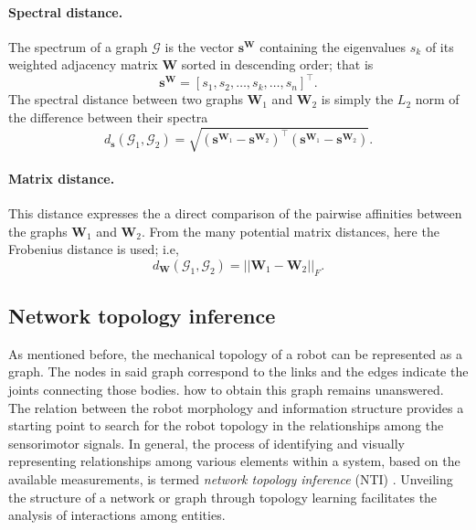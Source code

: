 \paragraph*{Spectral distance.} The spectrum of a graph $\mathcal{G}$ is the vector $ \bm{s}^{\bm{W}}$ containing the eigenvalues $s_k$ of its weighted adjacency matrix $\bm{W}$ sorted in descending order; that is
\begin{equation}
	\bm{s}^{\bm{W}} = [s_1,s_2,\ldots,s_k,\ldots,s_n]^\intercal.
\end{equation}
The spectral distance between two graphs $\bm{W}_1$ and $\bm{W}_2$ is simply the $L_2$ norm of the difference between their spectra
\begin{equation}
	d_{\bm{s}}\left(\mathcal{G}_1,\mathcal{G}_2\right) = \sqrt{\left(\bm{s}^{\bm{W}_1}-\bm{s}^{\bm{W}_2}\right)^\intercal\left(\bm{s}^{\bm{W}_1}-\bm{s}^{\bm{W}_2}\right)}.
\end{equation}

\paragraph*{Matrix distance.} This distance expresses the a direct comparison of the pairwise affinities between the graphs $\bm{W}_1$ and $\bm{W}_2$. From the many potential matrix distances, here the Frobenius distance is used; i.e,
\begin{equation}
	d_{\bm{W}}\left(\mathcal{G}_1,\mathcal{G}_2\right) =\lvert \lvert \bm{W}_1- \bm{W}_2\rvert \rvert_F.
\end{equation}

\subsection{Network topology inference}\label{sec:network_topology_inference}
As mentioned before, the mechanical topology of a robot can be represented as a graph. The nodes in said graph correspond to the links and the edges indicate the joints connecting those bodies. how to obtain this graph remains unanswered. The relation between the robot morphology and information structure provides a starting point to search for the robot topology in the relationships among the sensorimotor signals. In general, the process of identifying and visually representing relationships among various elements within a system, based on the available measurements, is termed \emph{network topology inference} (NTI) \cite{Dong2019Learninggraphsdata}. Unveiling the structure of a network or graph through topology learning facilitates the analysis of interactions among entities. 

